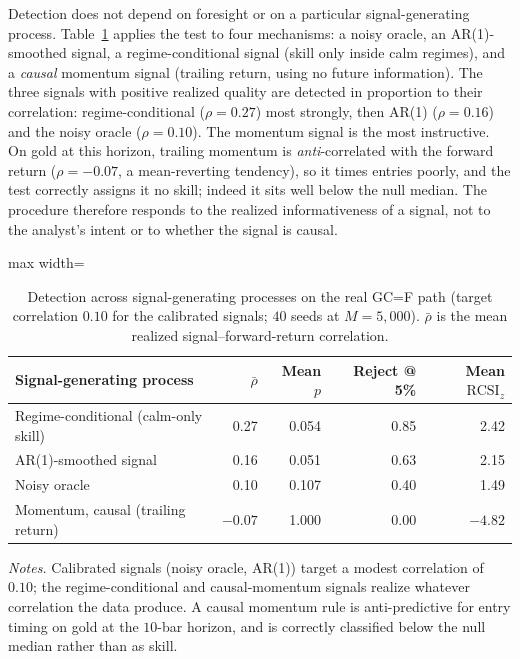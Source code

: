 \documentclass[preprint,12pt]{elsarticle}
\theoremstyle{definition}
\begin{document}
Detection does not depend on foresight or on a particular signal-generating process. Table~\ref{tab:signal_mechanisms} applies the test to four mechanisms: a noisy oracle, an AR(1)-smoothed signal, a regime-conditional signal (skill only inside calm regimes), and a \emph{causal} momentum signal (trailing return, using no future information). The three signals with positive realized quality are detected in proportion to their correlation: regime-conditional ($\rho=0.27$) most strongly, then AR(1) ($\rho=0.16$) and the noisy oracle ($\rho=0.10$). The momentum signal is the most instructive. On gold at this horizon, trailing momentum is \emph{anti}-correlated with the forward return ($\rho=-0.07$, a mean-reverting tendency), so it times entries poorly, and the test correctly assigns it no skill; indeed it sits well below the null median. The procedure therefore responds to the realized informativeness of a signal, not to the analyst's intent or to whether the signal is causal.

\begin{table}[H]
\centering
\caption{Detection across signal-generating processes on the real GC=F path (target correlation $0.10$ for the calibrated signals; $40$ seeds at $M=5{,}000$). $\bar\rho$ is the mean realized signal--forward-return correlation.}
\label{tab:signal_mechanisms}
{\small
\renewcommand{\arraystretch}{1.12}
\begin{adjustbox}{max width=\textwidth}
\begin{tabular}{@{}lrrrr@{}}
\toprule
Signal-generating process & $\bar\rho$ & Mean $p$ & Reject @ 5\% & Mean $\mathrm{RCSI}_z$ \\
\midrule
Regime-conditional (calm-only skill) & \phantom{-}0.27 & 0.054 & 0.85 & \phantom{-}2.42 \\
AR(1)-smoothed signal & \phantom{-}0.16 & 0.051 & 0.63 & \phantom{-}2.15 \\
Noisy oracle & \phantom{-}0.10 & 0.107 & 0.40 & \phantom{-}1.49 \\
Momentum, causal (trailing return) & $-0.07$ & 1.000 & 0.00 & $-4.82$ \\
\bottomrule
\end{tabular}
\end{adjustbox}
}
\par\vspace{0.5em}
\begin{minipage}{0.95\textwidth}
\centering
\footnotesize\emph{Notes.} Calibrated signals (noisy oracle, AR(1)) target a modest correlation of $0.10$; the regime-conditional and causal-momentum signals realize whatever correlation the data produce. A causal momentum rule is anti-predictive for entry timing on gold at the $10$-bar horizon, and is correctly classified below the null median rather than as skill.
\end{minipage}
\end{table}
\end{document}
